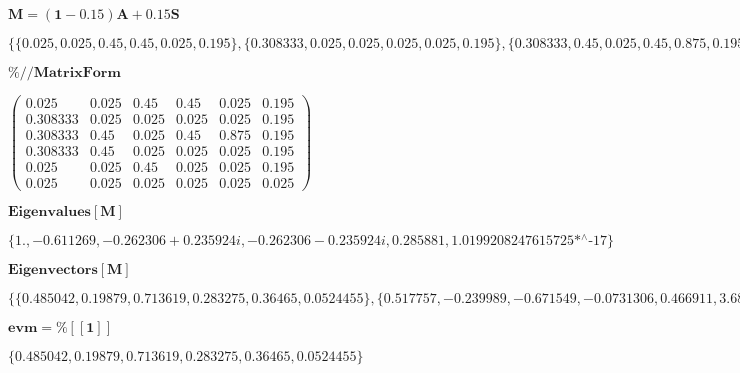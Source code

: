 \documentclass{article}
\begin{document}
\noindent\(\pmb{M=(1-0.15)A+0.15S}\)

\noindent\(\{\{0.025,0.025,0.45,0.45,0.025,0.195\},\{0.308333,0.025,0.025,0.025,0.025,0.195\},\{0.308333,0.45,0.025,0.45,0.875,0.195\},\{0.308333,0.45,0.025,0.025,0.025,0.195\},\{0.025,0.025,0.45,0.025,0.025,0.195\},\{0.025,0.025,0.025,0.025,0.025,0.025\}\}\)

\noindent\(\pmb{\%\text{//}\text{MatrixForm}}\)

\noindent\(\left(
\begin{array}{cccccc}
 0.025 & 0.025 & 0.45 & 0.45 & 0.025 & 0.195 \\
 0.308333 & 0.025 & 0.025 & 0.025 & 0.025 & 0.195 \\
 0.308333 & 0.45 & 0.025 & 0.45 & 0.875 & 0.195 \\
 0.308333 & 0.45 & 0.025 & 0.025 & 0.025 & 0.195 \\
 0.025 & 0.025 & 0.45 & 0.025 & 0.025 & 0.195 \\
 0.025 & 0.025 & 0.025 & 0.025 & 0.025 & 0.025
\end{array}
\right)\)

\noindent\(\pmb{\text{Eigenvalues}[M]}\)

\noindent\(\{1.,-0.611269,-0.262306+0.235924 i,-0.262306-0.235924 i,0.285881,\text{1.0199208247615725$\grave{ }$*${}^{\wedge}$-17}\}\)

\noindent\(\pmb{\text{Eigenvectors}[M]}\)

\noindent\(\{\{0.485042,0.19879,0.713619,0.283275,0.36465,0.0524455\},\{0.517757,-0.239989,-0.671549,-0.0731306,0.466911,\text{3.6830639204873993$\grave{
}$*${}^{\wedge}$-17}\},\{0.682199+0. i,-0.407353-0.366382 i,-0.0833974+0.0887608 i,-0.33765+0.289938 i,0.146202-0.0123168 i,\text{1.956227283832031$\grave{
}$*${}^{\wedge}$-17}+\text{1.3156850108107444$\grave{ }$*${}^{\wedge}$-17} i\},\{0.682199+0. i,-0.407353+0.366382 i,-0.0833974-0.0887608 i,-0.33765-0.289938
i,0.146202+0.0123168 i,\text{1.956227283832031$\grave{ }$*${}^{\wedge}$-17}-\text{1.3156850108107444$\grave{ }$*${}^{\wedge}$-17} i\},\{-0.233368,-0.231287,0.418149,-0.575126,0.621633,\text{1.588683736476077$\grave{
}$*${}^{\wedge}$-17}\},\{-0.486664,-\text{7.426532209294064$\grave{ }$*${}^{\wedge}$-17},-0.324443,-\text{7.997803917701299$\grave{ }$*${}^{\wedge}$-17},\text{3.656138933806308$\grave{
}$*${}^{\wedge}$-16},0.811107\}\}\)

\noindent\(\pmb{\text{evm}=\%[[1]]}\)

\noindent\(\{0.485042,0.19879,0.713619,0.283275,0.36465,0.0524455\}\)
\end{document}
